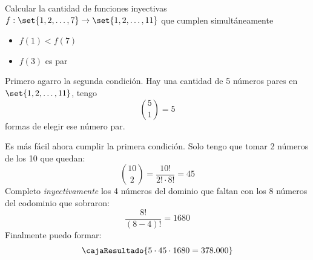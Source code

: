 \begin{enunciado}{}

  Calcular la cantidad de funciones inyectivas $f: \set{1,2,\ldots, 7} \to \set{1,2, \ldots, 11}$
  que cumplen simultáneamente
  \begin{itemize}
    \item $f(1) < f(7)$
    \item $f(3)$ es par
  \end{itemize}
\end{enunciado}


Primero agarro la segunda condición. Hay una cantidad de 5 números pares en $\set{1,2, \ldots, 11}$, tengo
$$
  \binom{5}{1} = 5
$$
formas de elegir ese número par.

Es más fácil ahora cumplir la primera condición. Solo tengo que tomar 2 números de los 10 que quedan:
$$
  \binom{10}{2} = \frac{10!}{2! \cdot 8!} = 45
$$
Completo \textit{inyectivamente} los 4 números del
dominio que faltan con los 8 números del codominio que sobraron:
$$
  \frac{8!}{(8 - 4)!} = 1680
$$
Finalmente puedo formar:
$$
  \cajaResultado{
    5 \cdot 45 \cdot 1680 = 378.000
  }
$$

\bigskip

